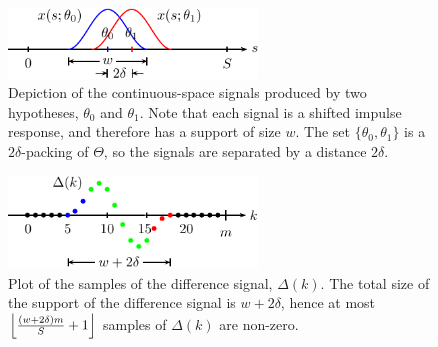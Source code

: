 \documentclass[conference,letterpaper]{IEEEtran}
\DeclarePairedDelimiter\floor{\lfloor}{\rfloor}
\begin{document}
\begin{figure}[t]
	\centering
	\includegraphics[width=2.6in]{overlap-middle-pics}
	\vspace{-3pt}
	\caption{Depiction of the continuous-space signals produced by two
		hypotheses, $\theta_0$ and $\theta_1$. Note that each signal is a
		shifted impulse response, and therefore has a support of size $w$.
		The set $\{\theta_0, \theta_1\}$ is a $2\delta$-packing of
		$\Theta$, so the signals are separated by a distance $2\delta$.}
	\label{fig:overlap-middle}
\end{figure}
\begin{figure}[t]
	\centering
	\includegraphics[width=2.6in]{delta-sampled-pics}
	\vspace{-3pt}
	\caption{Plot of the samples of the difference signal, $\Delta(k)$. The
		total size of the support of the difference signal is $w+2\delta$,
		hence at most $\floor*{\frac{(w + 2\delta)m}{S} + 1}$ samples of
		$\Delta(k)$ are non-zero.}
	\label{fig:delta-sampled}
\end{figure}
\end{document}
